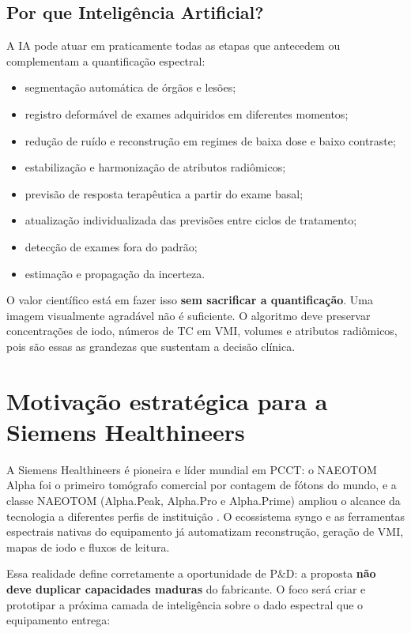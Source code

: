 \documentclass[11pt,a4paper]{article}
\begin{document}
\subsection{Por que Inteligência Artificial?}

A IA pode atuar em praticamente todas as etapas que antecedem ou complementam a quantificação espectral:

\begin{itemize}
\item segmentação automática de órgãos e lesões;
\item registro deformável de exames adquiridos em diferentes momentos;
\item redução de ruído e reconstrução em regimes de baixa dose e baixo contraste;
\item estabilização e harmonização de atributos radiômicos;
\item previsão de resposta terapêutica a partir do exame basal;
\item atualização individualizada das previsões entre ciclos de tratamento;
\item detecção de exames fora do padrão;
\item estimação e propagação da incerteza.
\end{itemize}

O valor científico está em fazer isso \textbf{sem sacrificar a quantificação}. Uma imagem visualmente agradável não é suficiente. O algoritmo deve preservar concentrações de iodo, números de TC em VMI, volumes e atributos radiômicos, pois são essas as grandezas que sustentam a decisão clínica.

\section{Motivação estratégica para a Siemens Healthineers}

A Siemens Healthineers é pioneira e líder mundial em PCCT: o NAEOTOM Alpha foi o primeiro tomógrafo comercial por contagem de fótons do mundo, e a classe NAEOTOM (Alpha.Peak, Alpha.Pro e Alpha.Prime) ampliou o alcance da tecnologia a diferentes perfis de instituição \cite{siemensfda,siemensbr}. O ecossistema syngo e as ferramentas espectrais nativas do equipamento já automatizam reconstrução, geração de VMI, mapas de iodo e fluxos de leitura.

Essa realidade define corretamente a oportunidade de P\&D: a proposta \textbf{não deve duplicar capacidades maduras} do fabricante. O foco será criar e prototipar a próxima camada de inteligência sobre o dado espectral que o equipamento entrega:
\end{document}
